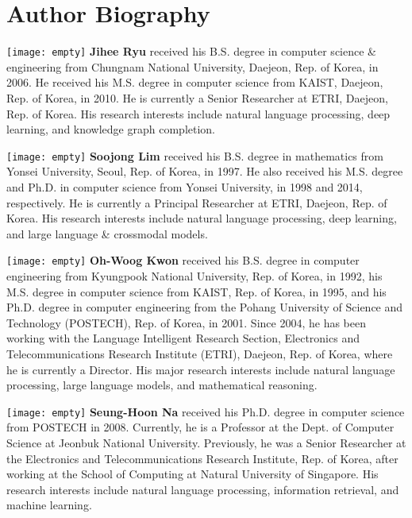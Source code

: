 \documentclass[AMS,STIX2COL]{WileyNJD-v2}
\begin{document}
    


    \section*{Author Biography}

    \begin{biography}
    {\texttt{[image: empty]}}
    {\textbf{Jihee Ryu} received his B.S. degree in computer science \& engineering from Chungnam National University, Daejeon, Rep. of Korea, in 2006. He received his M.S. degree in computer science from KAIST, Daejeon, Rep. of Korea, in 2010. He is currently a Senior Researcher at ETRI, Daejeon, Rep. of Korea. His research interests include natural language processing, deep learning, and knowledge graph completion.}
    \end{biography}

    \begin{biography}
    {\texttt{[image: empty]}}
    {\textbf{Soojong Lim} received his B.S. degree in mathematics from Yonsei University, Seoul, Rep. of Korea, in 1997. He also received his M.S. degree and Ph.D. in computer science from Yonsei University, in 1998 and 2014, respectively. He is currently a Principal Researcher at ETRI, Daejeon, Rep. of Korea. His research interests include natural language processing, deep learning, and large language \& crossmodal models.}
    \end{biography}

    \begin{biography}
    {\texttt{[image: empty]}}
    {\textbf{Oh-Woog Kwon} received his B.S. degree in computer engineering from Kyungpook National University, Rep. of Korea, in 1992, his M.S. degree in computer science from KAIST, Rep. of Korea, in 1995, and his Ph.D. degree in computer engineering from the Pohang University of Science and Technology (POSTECH), Rep. of Korea, in 2001. Since 2004, he has been working with the Language Intelligent Research Section, Electronics and Telecommunications Research Institute (ETRI), Daejeon, Rep. of Korea, where he is currently a Director. His major research interests include natural language processing, large language models, and mathematical reasoning.}
    \end{biography}

    \begin{biography}
    {\texttt{[image: empty]}}
    {\textbf{Seung-Hoon Na} received his Ph.D. degree in computer science from POSTECH in 2008. Currently, he is a Professor at the Dept. of Computer Science at Jeonbuk National University. Previously, he was a Senior Researcher at the Electronics and Telecommunications Research Institute, Rep. of Korea, after working at the School of Computing at Natural University of Singapore. His research interests include natural language processing, information retrieval, and machine learning.}
    \end{biography}
\end{document}

